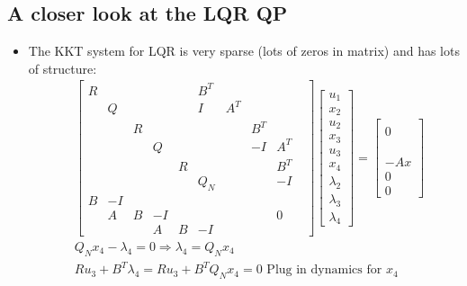 \documentclass[11pt]{article}
\begin{document}
\subsection{A closer look at the LQR QP}
\begin{itemize}
    \item The KKT system for LQR is very sparse (lots of zeros in matrix) and has lots of structure:
    \begin{align*}
    &\begin{bmatrix}
        R & & & & & B^T & & & &  \\
        & Q & & & & I & A^T & &  \\
        & & R & & & & & B^T & \\
        & & & Q & & & & -I& A^T\\
        & & & & R & & & & B^T\\
        & & & & & Q_N & & & -I\\
        B & -I & & & & & & \\
        & A & B & -I& & & & & 0 \\
        & & & A & B & -I & & &
    \end{bmatrix}
         \begin{bmatrix}
            u_1 \\
            x_2 \\
            u_2 \\
            x_3 \\
            u_3 \\
            x_4 \\
            \lambda_2 \\
            \lambda_3 \\
            \lambda_4
        \end{bmatrix}
    =
    \begin{bmatrix}
        \\
        0
        \\
        \\
        \\
        \\
        -Ax \\
        0 \\
        0
    \end{bmatrix}
    \\
   & Q_Nx_4 - \lambda_4 = 0 \Rightarrow \lambda_4 = Q_Nx_4
    \\
   & Ru_3 + B^T\lambda_4 = Ru_3 + B^TQ_Nx_4 = 0 \text{ Plug in dynamics for }x_4
    \\

\end{align*}
\end{itemize}
\end{document}
